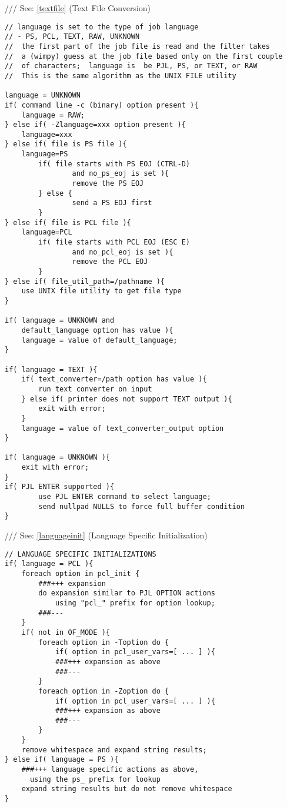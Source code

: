 \documentclass[a4paper]{article}
\begin{document}
{\ttfamily ///} See: \ref{textfile} {(Text File Conversion)}
\begin{tscreen}
\begin{verbatim}
// language is set to the type of job language
// - PS, PCL, TEXT, RAW, UNKNOWN
//  the first part of the job file is read and the filter takes
//  a (wimpy) guess at the job file based only on the first couple
//  of characters;  language is  be PJL, PS, or TEXT, or RAW
//  This is the same algorithm as the UNIX FILE utility

language = UNKNOWN
if( command line -c (binary) option present ){
    language = RAW;
} else if( -Zlanguage=xxx option present ){
    language=xxx
} else if( file is PS file ){
    language=PS
        if( file starts with PS EOJ (CTRL-D)
                and no_ps_eoj is set ){
                remove the PS EOJ
        } else {
                send a PS EOJ first
        }
} else if( file is PCL file ){
    language=PCL
        if( file starts with PCL EOJ (ESC E)
                and no_pcl_eoj is set ){
                remove the PCL EOJ
        }
} else if( file_util_path=/pathname ){
    use UNIX file utility to get file type
}

if( language = UNKNOWN and
    default_language option has value ){
    language = value of default_language;
}

if( language = TEXT ){
    if( text_converter=/path option has value ){
        run text converter on input
    } else if( printer does not support TEXT output ){
        exit with error;
    }
    language = value of text_converter_output option
}

if( language = UNKNOWN ){
    exit with error;
}
if( PJL ENTER supported ){
        use PJL ENTER command to select language;
        send nullpad NULLS to force full buffer condition
}
\end{verbatim}
\end{tscreen}

{\ttfamily ///} See: \ref{languageinit} {(Language Specific Initialization)}
\begin{tscreen}
\begin{verbatim}
// LANGUAGE SPECIFIC INITIALIZATIONS
if( language = PCL ){
    foreach option in pcl_init {
        ###+++ expansion 
        do expansion similar to PJL OPTION actions
            using "pcl_" prefix for option lookup;
        ###---
    }
    if( not in OF_MODE ){
        foreach option in -Toption do {
            if( option in pcl_user_vars=[ ... ] ){
            ###+++ expansion as above
            ###---
        }
        foreach option in -Zoption do {
            if( option in pcl_user_vars=[ ... ] ){
            ###+++ expansion as above
            ###---
        }
    }
    remove whitespace and expand string results;
} else if( language = PS ){
    ###+++ language specific actions as above,
      using the ps_ prefix for lookup 
    expand string results but do not remove whitespace
}
\end{verbatim}
\end{tscreen}
\end{document}
